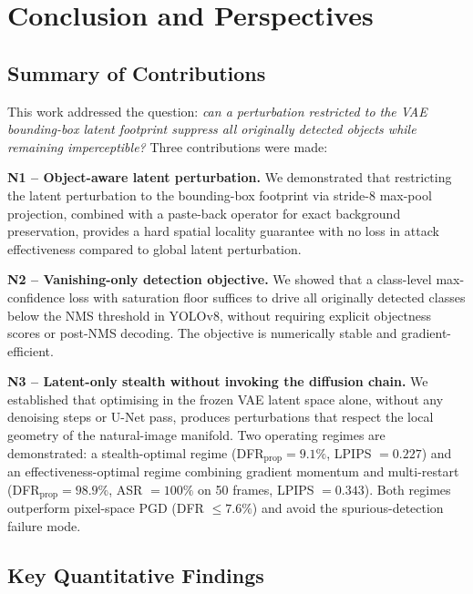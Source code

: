 \documentclass[12pt,a4paper]{report}
\begin{document}
\chapter*{Conclusion and Perspectives}
\label{ch:conclusion}
\label{sec:perspectives}

\section{Summary of Contributions}
\label{sec:summary}

This work addressed the question: \textit{can a perturbation restricted to the VAE
bounding-box latent footprint suppress all originally detected objects while remaining
imperceptible?} Three contributions were made:

\textbf{N1 -- Object-aware latent perturbation.}
We demonstrated that restricting the latent perturbation to the bounding-box footprint via stride-8 max-pool projection, combined with a paste-back operator for exact background preservation, provides a hard spatial locality guarantee with no loss in attack effectiveness compared to global latent perturbation.

\textbf{N2 -- Vanishing-only detection objective.}
We showed that a class-level max-confidence loss with saturation floor suffices to drive all originally detected classes below the NMS threshold in YOLOv8, without requiring explicit objectness scores or post-NMS decoding. The objective is numerically stable and gradient-efficient.

\textbf{N3 -- Latent-only stealth without invoking the diffusion chain.}
We established that optimising in the frozen VAE latent space alone, without
any denoising steps or U-Net pass, produces perturbations that respect the
local geometry of the natural-image manifold. Two operating regimes are
demonstrated: a stealth-optimal regime (DFR$_\text{prop} = 9.1\%$,
LPIPS $= 0.227$) and an effectiveness-optimal regime combining gradient
momentum and multi-restart (DFR$_\text{prop} = 98.9\%$, ASR $= 100\%$
on 50 frames, LPIPS $= 0.343$). Both regimes outperform pixel-space
PGD (DFR $\leq 7.6\%$) and avoid the spurious-detection failure mode.

\section{Key Quantitative Findings}
\label{sec:findings}
\end{document}

